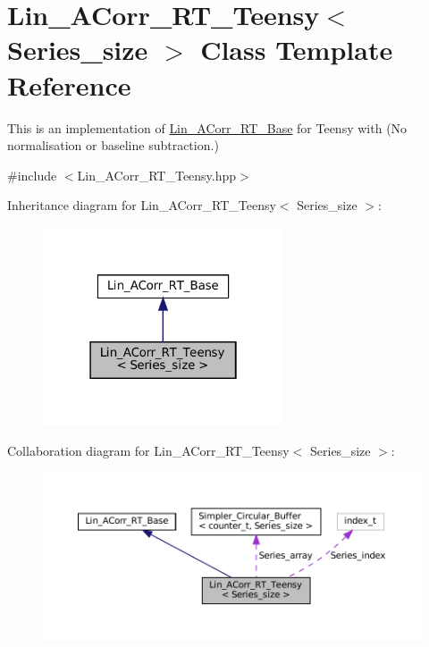\hypertarget{classLin__ACorr__RT__Teensy}{}\section{Lin\+\_\+\+A\+Corr\+\_\+\+R\+T\+\_\+\+Teensy$<$ Series\+\_\+size $>$ Class Template Reference}
\label{classLin__ACorr__RT__Teensy}


This is an implementation of \hyperlink{classLin__ACorr__RT__Base}{Lin\+\_\+\+A\+Corr\+\_\+\+R\+T\+\_\+\+Base} for Teensy with {\bfseries }(No normalisation or baseline subtraction.)  




{\ttfamily \#include $<$Lin\+\_\+\+A\+Corr\+\_\+\+R\+T\+\_\+\+Teensy.\+hpp$>$}



Inheritance diagram for Lin\+\_\+\+A\+Corr\+\_\+\+R\+T\+\_\+\+Teensy$<$ Series\+\_\+size $>$\+:
\nopagebreak
\begin{figure}[H]
\begin{center}
\leavevmode
\includegraphics[width=202pt]{classLin__ACorr__RT__Teensy__inherit__graph}
\end{center}
\end{figure}


Collaboration diagram for Lin\+\_\+\+A\+Corr\+\_\+\+R\+T\+\_\+\+Teensy$<$ Series\+\_\+size $>$\+:
\nopagebreak
\begin{figure}[H]
\begin{center}
\leavevmode
\includegraphics[width=350pt]{classLin__ACorr__RT__Teensy__coll__graph}
\end{center}
\end{figure}
